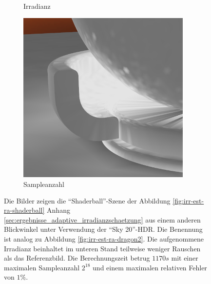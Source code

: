 \begin{figure}[h]
\begin{subfigure}[t]{0.33\textwidth}
				\caption{Irradianz}
			\end{subfigure}
			\begin{subfigure}[t]{0.33\textwidth}
				\center
				\includegraphics[width=0.95\textwidth]{pic/irr_est-ra-shaderball2-scount.png}
				\caption{Sampleanzahl}
			\end{subfigure}
			\caption[Vertex Lighting anhand der \enquote{Shaderball}-Szene mit \enquote{Sky 20}-HDR]{Die Bilder zeigen die \enquote{Shaderball}-Szene der Abbildung \ref{fig:irr-est-ra-shaderball} Anhang \ref{sec:ergebnisse_adaptive_irradianzschaetzung} aus einem anderen Blickwinkel unter Verwendung der \enquote{Sky 20}-HDR. Die Benennung ist analog zu Abbildung \ref{fig:irr-est-ra-dragon2}. Die aufgenommene Irradianz beinhaltet im unteren Stand teilweise weniger Rauschen als das Referenzbild. Die Berechnungszeit betrug $1170\unit{s}$ mit einer maximalen Sampleanzahl $2^{18}$ und einem maximalen relativen Fehler von $1\unit{\%}$.}
			\label{fig:irr-est-ra-shaderball2}
		\end{figure}

